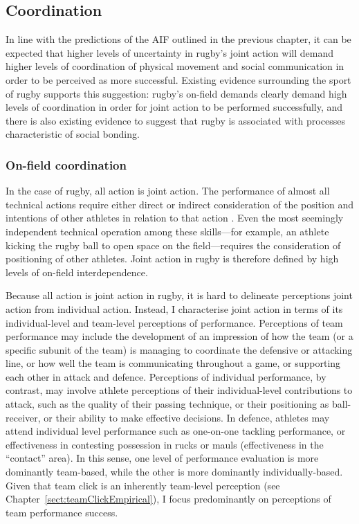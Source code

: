 \begin{CJK}{UTF8}{gbsn}
\subsection{Coordination}
In line with the predictions of the AIF outlined in the previous chapter, it can be expected that higher levels of uncertainty in rugby's joint action will demand higher levels of coordination of physical movement and social communication in order to be perceived as more successful.  Existing evidence surrounding the sport of rugby supports this suggestion: rugby's on-field demands clearly demand high levels of coordination in order for joint action to be performed successfully, and there is also existing evidence to suggest that rugby is associated with processes characteristic of social bonding.

\subsubsection{On-field coordination}
In the case of rugby, all action is joint action.  The performance of almost all technical actions require either direct or indirect consideration of the position and intentions of other athletes in relation to that action \citep{Downey2012}.  Even the most seemingly independent technical operation among these skills---for example, an athlete kicking the rugby ball to open space on the field---requires the consideration of positioning of other athletes.  Joint action in rugby is therefore defined by high levels of on-field interdependence.

Because all action is joint action in rugby, it is hard to delineate perceptions joint action from individual action.  Instead, I characterise joint action in terms of its individual-level and team-level perceptions of performance. Perceptions of team performance may include the development of an impression of how the team (or a specific subunit of the team) is managing to coordinate the defensive or attacking line, or how well the team is communicating throughout a game, or supporting each other in attack and defence.  Perceptions of individual performance, by contrast, may involve athlete perceptions of their individual-level contributions to attack, such as the quality of their passing technique, or their positioning as ball-receiver, or their ability to make effective decisions.  In defence, athletes may attend individual level performance such as one-on-one tackling performance, or effectiveness in contesting possession in rucks or mauls (effectiveness in the ``contact'' area).  In this sense, one level of performance evaluation is more dominantly team-based, while the other is more dominantly individually-based.  Given that team click is an inherently team-level perception (see Chapter~\ref{sect:teamClickEmpirical}), I focus predominantly on perceptions of team performance success.



\end{CJK}
